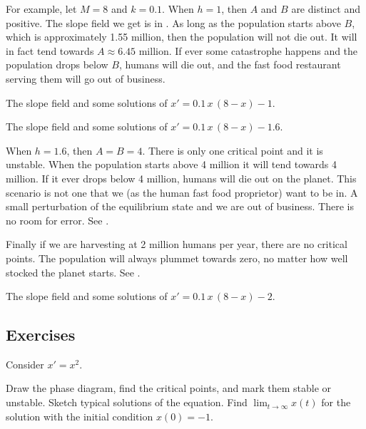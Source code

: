 For example, let $M=8$ and $k=0.1$.
When $h=1$, then $A$ and $B$ are distinct and positive.
The slope field we get is in .  As long as 
the population starts above $B$, which is approximately 1.55 million, then
the population will not die out.  It will in fact tend towards $A \approx
6.45$ million.  If ever some catastrophe happens and
the population drops below $B$,
humans will die out, and the fast food restaurant serving them will go out
of business.

\begin{myfig}
\parbox[t]{3.0in}{
 \capstart
 \caption{The slope field and some solutions of
 $x' = 0.1\,x\,(8-x)-1$.\label{2.2:harv1}}
}
\quad
\parbox[t]{3.0in}{
 \capstart
 \caption{The slope field and some solutions of
 $x' = 0.1\,x\,(8-x)-1.6$.\label{2.2:harvc}}
}
\end{myfig}

When $h = 1.6$, then $A=B=4$.  There is only one critical point and it is
unstable.  When the population starts above 4 million it will tend towards
4 million.  If it ever drops below 4 million, humans will die out on the
planet.  This scenario is not one that we (as the human fast food proprietor) 
want to be in.  A small perturbation of the equilibrium state and we are out
of business.  There is no room for error.  See .

Finally if we are harvesting at 2 million humans per year, there are no
critical points.
The population
will always plummet towards zero, no matter how well stocked the planet
starts.  See .

\begin{myfig}
\capstart
{}
\caption{The slope field and some solutions of
$x' = 0.1\,x\,(8-x)-2$.\label{2.2:harv2}}
\end{myfig}


\subsection{Exercises}

\begin{samepage}
\begin{exercise}
Consider $x' = x^2$.
\begin{tasks}
\task Draw the phase diagram,
find the critical points, and mark them stable or unstable.
\task Sketch typical solutions of the equation.
\task Find $\displaystyle \lim_{t\to \infty} x(t)$ for the solution with the initial condition
$x(0) = -1$.
\end{tasks}
\end{exercise}
\end{samepage}

